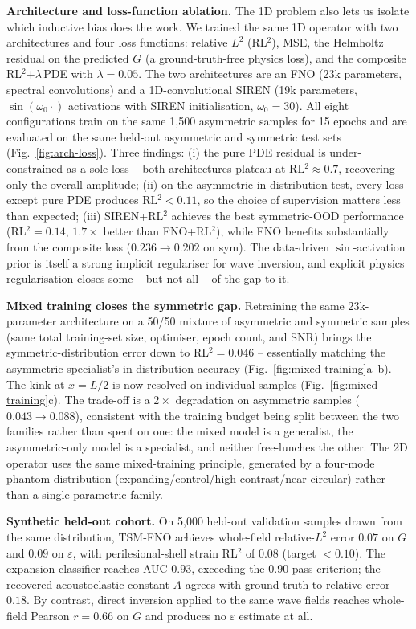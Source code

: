 \documentclass[11pt,letterpaper]{article}
\newcommand{\eps}{\varepsilon}
\begin{document}
\textbf{Architecture and loss-function ablation.}
The 1D problem also lets us isolate which inductive bias does the work.
We trained the same 1D operator with two architectures and four loss
functions: relative $L^2$ (RL$^2$), MSE, the Helmholtz residual on the
predicted $G$ (a ground-truth-free physics loss), and the composite
RL$^2$+$\lambda$\,PDE with $\lambda=0.05$. The two architectures are an
FNO (23k parameters, spectral convolutions) and a 1D-convolutional SIREN
(19k parameters, $\sin(\omega_{0}\!\cdot)$ activations with SIREN
initialisation, $\omega_{0}\!=\!30$). All eight configurations train on
the same 1{,}500 asymmetric samples for 15 epochs and are evaluated on the
same held-out asymmetric and symmetric test sets
(Fig.~\ref{fig:arch-loss}). Three findings: (i) the pure PDE residual is
under-constrained as a sole loss -- both architectures plateau at
RL$^{2}\!\approx\!0.7$, recovering only the overall amplitude; (ii) on
the asymmetric in-distribution test, every loss except pure PDE produces
RL$^{2}<0.11$, so the choice of supervision matters less than expected;
(iii) SIREN+RL$^{2}$ achieves the best symmetric-OOD performance
(RL$^{2}=0.14$, $1.7\!\times\!$ better than FNO+RL$^{2}$), while
FNO benefits substantially from the composite loss
($0.236\!\to\!0.202$ on sym). The data-driven $\sin$-activation prior is
itself a strong implicit regulariser for wave inversion, and explicit
physics regularisation closes some -- but not all -- of the gap to it.

\textbf{Mixed training closes the symmetric gap.}
Retraining the same 23k-parameter architecture on a 50/50 mixture of
asymmetric and symmetric samples (same total training-set size,
optimiser, epoch count, and SNR) brings the symmetric-distribution
error down to RL$^{2}=0.046$ -- essentially matching the asymmetric
specialist's in-distribution accuracy
(Fig.~\ref{fig:mixed-training}a--b). The kink at $x=L/2$ is now
resolved on individual samples (Fig.~\ref{fig:mixed-training}c). The
trade-off is a $2\!\times$ degradation on asymmetric samples ($0.043
\!\to\!0.088$), consistent with the training budget being split between
the two families rather than spent on one: the mixed model is a
generalist, the asymmetric-only model is a specialist, and neither
free-lunches the other. The 2D operator uses the same mixed-training
principle, generated by a four-mode phantom distribution
(expanding/control/high-contrast/near-circular) rather than a single
parametric family.

\textbf{Synthetic held-out cohort.}
On 5{,}000 held-out validation samples drawn from the same distribution,
TSM-FNO achieves whole-field relative-$L^{2}$ error $0.07$ on $G$ and
$0.09$ on $\eps$, with perilesional-shell strain RL$^{2}$ of $0.08$
(target $<0.10$). The expansion classifier reaches AUC $0.93$, exceeding
the $0.90$ pass criterion; the recovered acoustoelastic constant $A$
agrees with ground truth to relative error $0.18$. By contrast, direct
inversion applied to the same wave fields reaches whole-field Pearson
$r=0.66$ on $G$ and produces no $\eps$ estimate at all.
\end{document}

